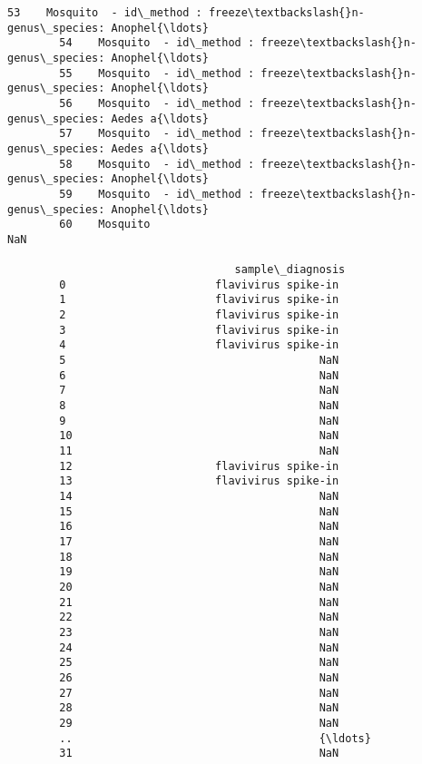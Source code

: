 \documentclass[11pt]{article}
\begin{document}
\begin{Verbatim}[commandchars=\\\{\}]
        53    Mosquito  - id\_method : freeze\textbackslash{}n- genus\_species: Anophel{\ldots}   
        54    Mosquito  - id\_method : freeze\textbackslash{}n- genus\_species: Anophel{\ldots}   
        55    Mosquito  - id\_method : freeze\textbackslash{}n- genus\_species: Anophel{\ldots}   
        56    Mosquito  - id\_method : freeze\textbackslash{}n- genus\_species: Aedes a{\ldots}   
        57    Mosquito  - id\_method : freeze\textbackslash{}n- genus\_species: Aedes a{\ldots}   
        58    Mosquito  - id\_method : freeze\textbackslash{}n- genus\_species: Anophel{\ldots}   
        59    Mosquito  - id\_method : freeze\textbackslash{}n- genus\_species: Anophel{\ldots}   
        60    Mosquito                                                NaN   
        
                                   sample\_diagnosis  
        0                       flavivirus spike-in  
        1                       flavivirus spike-in  
        2                       flavivirus spike-in  
        3                       flavivirus spike-in  
        4                       flavivirus spike-in  
        5                                       NaN  
        6                                       NaN  
        7                                       NaN  
        8                                       NaN  
        9                                       NaN  
        10                                      NaN  
        11                                      NaN  
        12                      flavivirus spike-in  
        13                      flavivirus spike-in  
        14                                      NaN  
        15                                      NaN  
        16                                      NaN  
        17                                      NaN  
        18                                      NaN  
        19                                      NaN  
        20                                      NaN  
        21                                      NaN  
        22                                      NaN  
        23                                      NaN  
        24                                      NaN  
        25                                      NaN  
        26                                      NaN  
        27                                      NaN  
        28                                      NaN  
        29                                      NaN  
        ..                                      {\ldots}  
        31                                      NaN  

\end{Verbatim}
\end{document}

